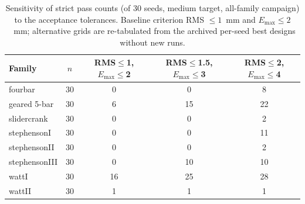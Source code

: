 \begin{table}[H]
\caption{Sensitivity of strict pass counts (of 30 seeds, medium target, all-family campaign) to the acceptance tolerances. Baseline criterion RMS $\leq 1$~mm and $E_{\max} \leq 2$~mm; alternative grids are re-tabulated from the archived per-seed best designs without new runs.}
\label{tab:tolerance_sensitivity}
\centering
\begin{tabular}{@{}lcccc@{}}
\hline
Family & $n$ & RMS$\leq$1, $E_{\max}\leq$2 & RMS$\leq$1.5, $E_{\max}\leq$3 & RMS$\leq$2, $E_{\max}\leq$4 \\
\hline
fourbar & 30 & 0 & 0 & 8 \\
geared 5-bar & 30 & 6 & 15 & 22 \\
slidercrank & 30 & 0 & 0 & 2 \\
stephensonI & 30 & 0 & 0 & 11 \\
stephensonII & 30 & 0 & 0 & 2 \\
stephensonIII & 30 & 0 & 10 & 10 \\
wattI & 30 & 16 & 25 & 28 \\
wattII & 30 & 1 & 1 & 1 \\
\hline
\end{tabular}
\end{table}